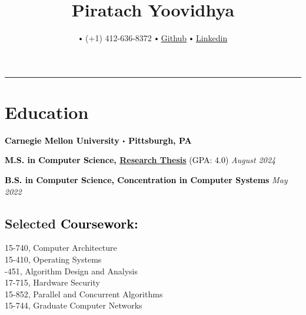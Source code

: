\documentclass[10pt]{article}
\title{\bfseries\Huge Piratach Yoovidhya}
\author{
  \small \myemail
   $\sbullet[.75]$
   (+1) 412-636-8372
   $\sbullet[.75]$
   \href{https://github.com/Piratach}{\underline{Github}}
   $\sbullet[.75]$
  \href{https://www.linkedin.com/in/piratach-yoovidhya/}
  {\underline{Linkedin}}
}
\date{}
\newcommand\sbullet[1][.5]{\mathbin{\vcenter{\hbox{\scalebox{#1}{$\bullet$}}}}}
\begin{document}
  \maketitle
  \thispagestyle{empty}
  \vspace*{-1.0cm}
  \hrule
  \vspace*{-0.15cm}

  \section*{\Large \textcolor{lighterB}{Education}}
  \vspace*{-0.3cm}

  \textbf{\large \textcolor{Black}{Carnegie Mellon University $\sbullet$ Pittsburgh, PA}}

  \vspace{0.05cm}

  \textcolor{Black}{\textbf{M.S. in Computer Science, \underline{\href{https://github.com/Piratach/thesis-document/blob/main/CMU-CS-24-143.pdf}{Research Thesis}}} (GPA: 4.0)} \hfill \textit{August 2024}

  \vspace{0.05cm}

\textcolor{Black}{\textbf{B.S. in Computer Science, Concentration in Computer Systems}} \hfill \textit{May 2022}

  \vspace{0.2cm}

  \vspace*{-0.5cm}

  \subsection*{Selected \textcolor{Black}{Coursework:}}

    \vspace*{-0.55cm}
    \begin{multicols}{2}
       15-740, Computer Architecture \\
       15-410, Operating Systems \\
       -451, Algorithm Design and Analysis \\
       17-715, Hardware Security \\
       15-852, Parallel and Concurrent Algorithms \\
       15-744, Graduate Computer Networks \\
    \end{multicols}
\end{document}
